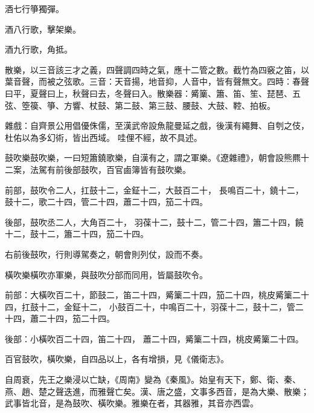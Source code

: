 \begin{pinyinscope}
 酒七行箏獨彈。



 酒八行歌，擊架樂。



 酒九行歌，角抵。



 散樂，以三音該三才之義，四聲調四時之氣，應十二管之數。截竹為四竅之笛，以葉音聲，而被之弦歌。三音：天音揚，地音抑，人音中，皆有聲無文。四時：春聲曰平，夏聲曰上，秋聲曰去，冬聲曰入。散樂器：觱篥、簫、笛、笙、琵琶、五弦、箜篌、箏、方響、杖鼓、第二鼓、第三鼓、腰鼓、大鼓、鞚、拍板。



 雜戲：自齊景公用倡優侏儒，至漢武帝設魚龍曼延之戲，後漢有繩舞、自刳之伎，杜佑以為多幻術，皆出西域。
 哇俚不經，故不具述。



 鼓吹樂鼓吹樂，一曰短簫鐃歌樂，自漢有之，謂之軍樂。《遼雜禮》，朝會設熊羆十二案，法駕有前後部鼓吹，百官鹵簿皆有鼓吹樂。



 前部，鼓吹令二人，扛鼓十二，金鉦十二，大鼓百二十，
 長鳴百二十，鐃十二，鼓十二，歌二十四，管二十四，蕭二十四，笳二十四。



 後部，鼓吹丞二人，大角百二十，
 羽葆十二，鼓十二，管二十四，簫二十四，饒十二，鼓十二，簫二十四，笳二十四。



 右前後鼓吹，行則導駕奏之，朝會則列仗，設而不奏。



 橫吹樂橫吹亦軍樂，與鼓吹分部而同用，皆屬鼓吹令。



 前部：大橫吹百二十，節鼓二，笛二十四，觱篥二十四，笳二十四，桃皮觱篥二十四，扛鼓十二，金鉦十二，
 小鼓百二十，中鳴百二十，羽葆十二，鼓十二，管二十四，蕭二十四，笳二十四。



 後部：小橫吹百二十四，笛二十四，
 蕭二十四，觱篥二十四，桃皮觱篥二十四。



 百官鼓吹，橫吹樂，自四品以上，各有增損，見《儀衛志》。



 自周衰，先王之樂浸以亡缺，《周南》變為《秦風》。始皇有天下，鄭、衛、秦、燕、趙、楚之聲迭進，而雅聲亡矣。漢、唐之盛，文事多西音，是為大樂、散樂；武事皆北音，是為鼓吹、橫吹樂。雅樂在者，其器雅，其音亦西雲。



\end{pinyinscope}